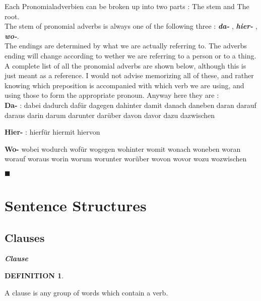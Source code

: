 \documentclass[a4paper,twocolumn,10pt]{article}
\newtheorem{mydef}{DEFINITION}[section]
\newcommand{\sectionend}
{
\nolinenumbers
\begin{center}
	$\blacksquare$
\end{center}
\clearpage
\linenumbers
}
\newcommand{\subsectionend}
{
\nolinenumbers
\linenumbers
}
\newcommand{\tcolorboxstart}
{
	\nolinenumbers
	\vspace{0.2cm}
	\centering
}
\newcommand{\tcolorboxend}
{
	\justifying
	\vspace{0.2cm}
	\linenumbers
}
\newcommand{\tcolorboxdefinition}[3]
{

\tcolorboxstart
\begin{defn-bg}

	\begin{defn-title}[width=7cm]{}
	{
		\normalsize \textbf{\textit{#1}}
	}
	\end{defn-title}

	\begin{defn-theword}
	{
		\footnotesize
		\begin{mydef} #2
		\end{mydef}
	}
	\end{defn-theword}


	\begin{defn-content}

	\justify
	#3

	\end{defn-content}

\end{defn-bg}
\tcolorboxend
}
\begin{document}
\noindent
Each Pronomialadverbien can be broken up into two parts : The stem and
The root.\\

\noindent The stem of pronomial adverbs is always one of the following three :
\textbf{\textit{da-}} , \textbf{\textit{hier-}} , \textbf{\textit{wo-}}.\\

\noindent The endings are determined by what we are actually referring to. The
adverbs ending will change according to wether we are referring to a person or
to a thing.\\


A complete list of all the pronomial adverbs are shown below, although this is
just meant as a reference. I would not advise memorizing all of these, and
rather knowing which preposition is accompanied with which verb we are using,
and using those to form the appropriate pronoun. Anyway here they are :\\

\textbf {Da-} : 
dabei
dadurch
dafür
dagegen
dahinter
damit
danach
daneben
daran
darauf
daraus
darin
darum
darunter
darüber
davon
davor
dazu
dazwischen

\textbf {Hier-} : 
hierfür
hiermit
hiervon

\textbf {Wo-}  
wobei
wodurch
wofür
wogegen
wohinter
womit
wonach
woneben
woran
worauf
woraus
worin
worum
worunter
worüber
wovon
wovor
wozu
wozwischen


\subsectionend

\sectionend

\section{{Sentence Structures}}
\label{sec:sentence_structures}

\subsection{Clauses}
\label{ssec:clauses}


\tcolorboxdefinition
{Clause}
{\label{def:clause}}
{

	A clause is any group of words which contain a
	verb.\cite{collins_german_grammar}


}

\end{document}
